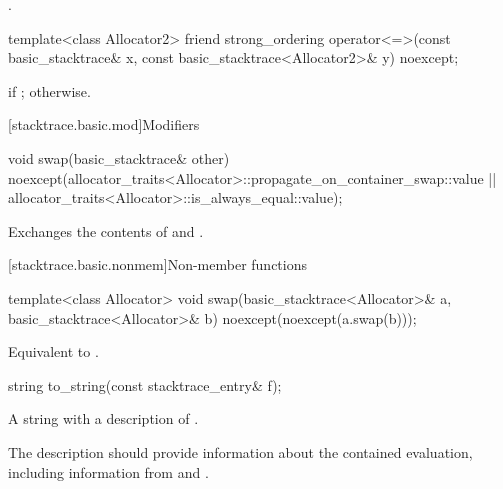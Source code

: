 \begin{itemdescr}
\pnum
\returns
{}.
\end{itemdescr}

%
\begin{itemdecl}
template<class Allocator2>
friend strong_ordering
  operator<=>(const basic_stacktrace& x, const basic_stacktrace<Allocator2>& y) noexcept;
\end{itemdecl}

\begin{itemdescr}
\pnum
\returns
{} if ;
otherwise.
\end{itemdescr}

[stacktrace.basic.mod]{Modifiers}

%
\begin{itemdecl}
void swap(basic_stacktrace& other)
  noexcept(allocator_traits<Allocator>::propagate_on_container_swap::value ||
    allocator_traits<Allocator>::is_always_equal::value);
\end{itemdecl}

\begin{itemdescr}
\pnum
\effects
Exchanges the contents of  and .
\end{itemdescr}

[stacktrace.basic.nonmem]{Non-member functions}

%
\begin{itemdecl}
template<class Allocator>
void swap(basic_stacktrace<Allocator>& a, basic_stacktrace<Allocator>& b)
  noexcept(noexcept(a.swap(b)));
\end{itemdecl}

\begin{itemdescr}
\pnum
\effects
Equivalent to .
\end{itemdescr}

%
\begin{itemdecl}
string to_string(const stacktrace_entry& f);
\end{itemdecl}

\begin{itemdescr}
\pnum
\returns
A string with a description of .

\pnum
\recommended
The description should provide information about the contained evaluation,
including information from
 and .
\end{itemdescr}

